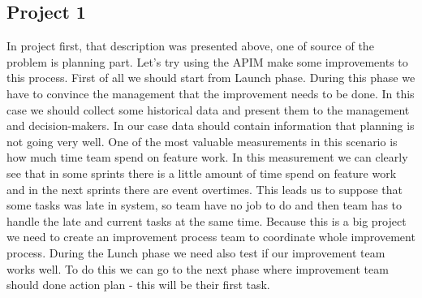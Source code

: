 \subsection*{Project 1}
In project first, that description was presented above, one of source of the problem is planning part. Let's try using the APIM make some improvements to this process.  First of all we should start from Launch phase. During this phase we have to convince the management that the improvement needs to be done. In this case we should collect some historical data and present them to the management and decision-makers. In our case data should contain information that planning is not going very well. One of the most valuable measurements in this scenario is how much time team spend on feature work. In this measurement we can clearly see that in some sprints there is a little amount of time spend on feature work and in the next sprints there are event overtimes. 
This leads us to suppose that some tasks was late in system, so team have no job to do and then team has to handle the late and current tasks at the same time. Because this is a big project we need to create an improvement process team to coordinate whole improvement process. During the Lunch phase we need also test if our improvement team works well. To do this we can go to the next phase where  improvement team should done action plan - this will be their first task.


